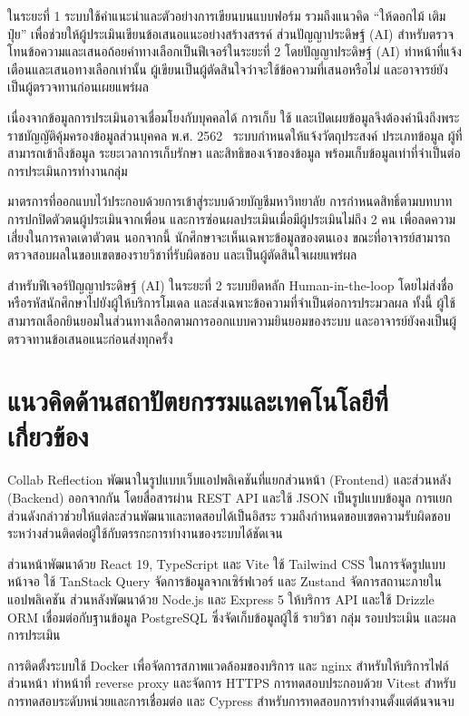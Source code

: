 ในระยะที่ 1 ระบบใช้คำแนะนำและตัวอย่างการเขียนบนแบบฟอร์ม รวมถึงแนวคิด ``ให้ดอกไม้ เติมปุ๋ย'' เพื่อช่วยให้ผู้ประเมินเขียนข้อเสนอแนะอย่างสร้างสรรค์ ส่วนปัญญาประดิษฐ์ (AI) สำหรับตรวจโทนข้อความและเสนอถ้อยคำทางเลือกเป็นฟีเจอร์ในระยะที่ 2 โดยปัญญาประดิษฐ์ (AI) ทำหน้าที่แจ้งเตือนและเสนอทางเลือกเท่านั้น ผู้เขียนเป็นผู้ตัดสินใจว่าจะใช้ข้อความที่เสนอหรือไม่ และอาจารย์ยังเป็นผู้ตรวจทานก่อนเผยแพร่ผล

เนื่องจากข้อมูลการประเมินอาจเชื่อมโยงกับบุคคลได้ การเก็บ ใช้ และเปิดเผยข้อมูลจึงต้องคำนึงถึงพระราชบัญญัติคุ้มครองข้อมูลส่วนบุคคล พ.ศ. 2562~\cite{pdpa2562} ระบบกำหนดให้แจ้งวัตถุประสงค์ ประเภทข้อมูล ผู้ที่สามารถเข้าถึงข้อมูล ระยะเวลาการเก็บรักษา และสิทธิของเจ้าของข้อมูล พร้อมเก็บข้อมูลเท่าที่จำเป็นต่อการประเมินการทำงานกลุ่ม

มาตรการที่ออกแบบไว้ประกอบด้วยการเข้าสู่ระบบด้วยบัญชีมหาวิทยาลัย การกำหนดสิทธิ์ตามบทบาท การปกปิดตัวตนผู้ประเมินจากเพื่อน และการซ่อนผลประเมินเมื่อมีผู้ประเมินไม่ถึง 2 คน เพื่อลดความเสี่ยงในการคาดเดาตัวตน นอกจากนี้ นักศึกษาจะเห็นเฉพาะข้อมูลของตนเอง ขณะที่อาจารย์สามารถตรวจสอบผลในขอบเขตของรายวิชาที่รับผิดชอบ และเป็นผู้ตัดสินใจเผยแพร่ผล

สำหรับฟีเจอร์ปัญญาประดิษฐ์ (AI) ในระยะที่ 2 ระบบยึดหลัก Human-in-the-loop โดยไม่ส่งชื่อหรือรหัสนักศึกษาไปยังผู้ให้บริการโมเดล และส่งเฉพาะข้อความที่จำเป็นต่อการประมวลผล ทั้งนี้ ผู้ใช้สามารถเลือกยินยอมในส่วนทางเลือกตามการออกแบบความยินยอมของระบบ และอาจารย์ยังคงเป็นผู้ตรวจทานข้อเสนอแนะก่อนส่งทุกครั้ง

\section{แนวคิดด้านสถาปัตยกรรมและเทคโนโลยีที่เกี่ยวข้อง}

Collab Reflection พัฒนาในรูปแบบเว็บแอปพลิเคชันที่แยกส่วนหน้า (Frontend) และส่วนหลัง (Backend) ออกจากกัน โดยสื่อสารผ่าน REST API และใช้ JSON เป็นรูปแบบข้อมูล การแยกส่วนดังกล่าวช่วยให้แต่ละส่วนพัฒนาและทดสอบได้เป็นอิสระ รวมถึงกำหนดขอบเขตความรับผิดชอบระหว่างส่วนติดต่อผู้ใช้กับตรรกะการทำงานของระบบได้ชัดเจน

ส่วนหน้าพัฒนาด้วย React 19, TypeScript และ Vite ใช้ Tailwind CSS ในการจัดรูปแบบหน้าจอ ใช้ TanStack Query จัดการข้อมูลจากเซิร์ฟเวอร์ และ Zustand จัดการสถานะภายในแอปพลิเคชัน ส่วนหลังพัฒนาด้วย Node.js และ Express 5 ให้บริการ API และใช้ Drizzle ORM เชื่อมต่อกับฐานข้อมูล PostgreSQL ซึ่งจัดเก็บข้อมูลผู้ใช้ รายวิชา กลุ่ม รอบประเมิน และผลการประเมิน

การติดตั้งระบบใช้ Docker เพื่อจัดการสภาพแวดล้อมของบริการ และ nginx สำหรับให้บริการไฟล์ส่วนหน้า ทำหน้าที่ reverse proxy และจัดการ HTTPS การทดสอบประกอบด้วย Vitest สำหรับการทดสอบระดับหน่วยและการเชื่อมต่อ และ Cypress สำหรับการทดสอบการทำงานตั้งแต่ต้นจนจบ

